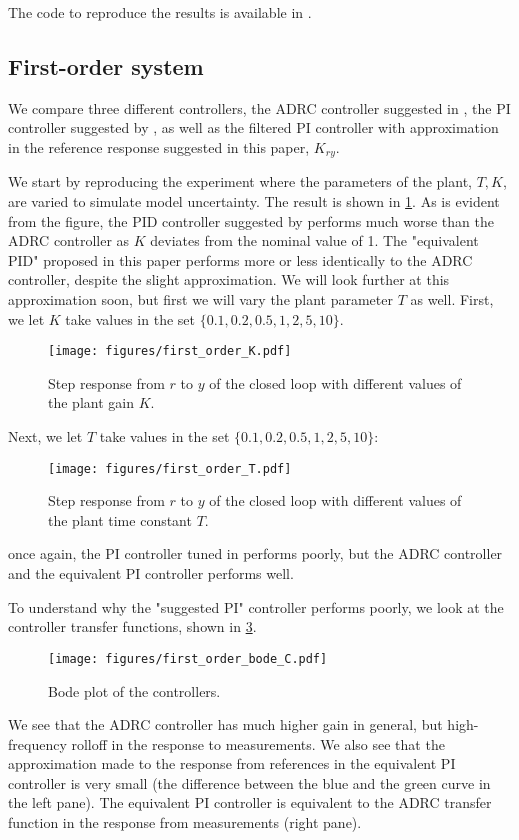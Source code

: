 \documentclass[letterpaper, 10 pt, conference]{ieeeconf}
\begin{document}
The code to reproduce the results is available in \cite{repo}.

\subsection{First-order system}

We compare three different controllers, the ADRC controller suggested in \cite{herbst2013simulative}, the PI controller suggested by \cite{herbst2013simulative}, as well as the filtered PI controller with approximation in the reference response suggested in this paper, $K_{ry}$.

We start by reproducing the experiment where the parameters of the plant, $T,K$, are varied to simulate model uncertainty. The result is shown in \cref{fig:first_order_K}. As is evident from the figure, the PID controller suggested by \cite{herbst2013simulative} performs much worse than the ADRC controller as $K$ deviates from the nominal value of 1. The "equivalent PID" proposed in this paper performs more or less identically to the ADRC controller, despite the slight approximation. We will look further at this approximation soon, but first we will vary the plant parameter $T$ as well.
First, we let $K$ take values in the set $\{0.1, 0.2, 0.5, 1, 2, 5, 10\}$.
\begin{figure}[h]
	\centering
	\texttt{[image: figures/first\_order\_K.pdf]}
	\caption{Step response from $r$ to $y$  of the closed loop with different values of the plant gain $K$.}
	\label{fig:first_order_K}
\end{figure}

Next, we let $T$ take values in the set $\{0.1, 0.2, 0.5, 1, 2, 5, 10\}$:
\begin{figure}[h]
	\centering
	\texttt{[image: figures/first\_order\_T.pdf]}
	\caption{Step response from $r$ to $y$  of the closed loop with different values of the plant time constant $T$.}
	\label{fig:first_order_T}
\end{figure}
once again, the PI controller tuned in \cite{herbst2013simulative} performs poorly, but the ADRC controller and the equivalent PI controller performs well.

To understand why the "suggested PI" controller performs poorly, we look at the controller transfer functions, shown in \cref{fig:first_order_bode_C}.
\begin{figure}[h]
	\centering
	\texttt{[image: figures/first\_order\_bode\_C.pdf]}
	\caption{Bode plot of the controllers.}
	\label{fig:first_order_bode_C}
\end{figure}
We see that the ADRC controller has much higher gain in general, but high-frequency rolloff in the response to measurements. We also see that the approximation made to the response from references in the equivalent PI controller is very small (the difference between the blue and the green curve in the left pane). The equivalent PI controller is equivalent to the ADRC transfer function in the response from measurements (right pane).
\end{document}
